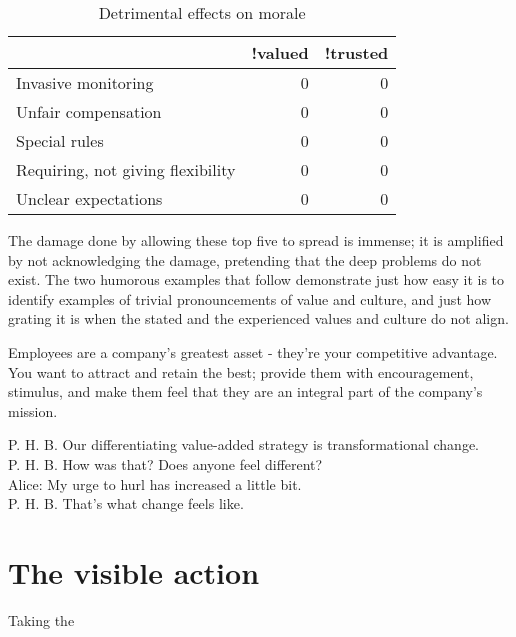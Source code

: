 \begin{table}[h]
    \begin{tabular}{lrr}
        \toprule
                                                & !valued & !trusted \\
        \midrule
        Invasive monitoring                 & 0          & 0 \\
        Unfair compensation                 & 0          & 0 \\
        Special rules                       & 0          & 0 \\         
        Requiring, not giving flexibility   & 0          & 0 \\
        Unclear expectations                & 0          & 0 \\
        \bottomrule
    \end{tabular}
    \caption{Detrimental effects on morale}
    \label{tbl:not-valued-not-trusted}
\end{table}

The damage done by allowing these top five to spread is immense; it is amplified by not acknowledging the damage, pretending that the deep problems do not exist. The two humorous examples that follow demonstrate just how easy it is to identify examples of trivial pronouncements of value and culture, and just how grating it is when the stated and the experienced values and culture do not align.

\begin{example}
Employees are a company's greatest asset - they're your competitive advantage. You want to attract and retain the best; provide them with encouragement, stimulus, and make them feel that they are an integral part of the company's mission.
\end{example}

\begin{example}
P. H. B. Our differentiating value-added strategy is transformational change. \\
P. H. B. How was that? Does anyone feel different? \\
Alice:   My urge to hurl has increased a little bit. \\
P. H. B. That's what change feels like.
\end{example}

\section{The visible action}
Taking the 

\printbibliography

 